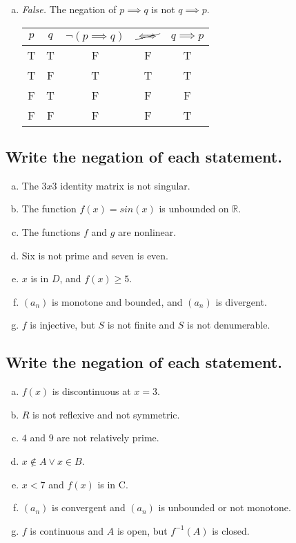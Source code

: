 \documentclass[12pt]{scrartcl} %
\begin{document}
\begin{enumerate}[(a)]
	\item \emph{False.} The negation of $p \implies q$ is not $q \implies p$.
	\begin{center}
	\begin{tabular}{*{2}{c}|*{3}{c}}$p$&$q$&$\neg(p \implies q)$&$
	\cancel{\iff} $&$q \implies p$\\
\hline
T&T&F&F&T\\
T&F&T&T&T\\
F&T&F&F&F\\
F&F&F&F&T\\
\end{tabular}\end{center}
\end{enumerate}
\subsection{Write the negation of each statement.}
\begin{enumerate}[(a)]
	\item The $3x3$ identity matrix is not singular.
	\item The function $f(x)=sin(x)$ is unbounded on $\mathbb{R}$.
	\item The functions $f$ and $g$ are nonlinear.
	\item Six is not prime and seven is even.
	\item $x$ is in $D$, and $f(x) \geq 5$.
	\item $(a_n)$ is monotone and bounded, and $(a_n)$ is divergent.
	\item $f$ is injective, but $S$ is not finite and $S$ is not denumerable.
\end{enumerate}
\subsection{Write the negation of each statement.}
\begin{enumerate}[(a)]
	\item $f(x)$ is discontinuous at $x=3$.
	\item $R$ is not reflexive and not symmetric.
	\item $4$ and $9$ are not relatively prime.
	\item $x \notin A \lor x \in B$.
	\item $x < 7$ and $f(x)$ is in C.
	\item $(a_n)$ is convergent and $(a_n)$ is unbounded or not monotone.
	\item $f$ is continuous and $A$ is open, but $f^{-1}(A)$ is closed.
\end{enumerate}
\end{document}
